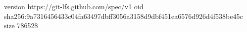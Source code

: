 version https://git-lfs.github.com/spec/v1
oid sha256:9a7316456433c04fa63497dbff3056a3158d9dbf451ea6576d926d4f538be45c
size 786528
